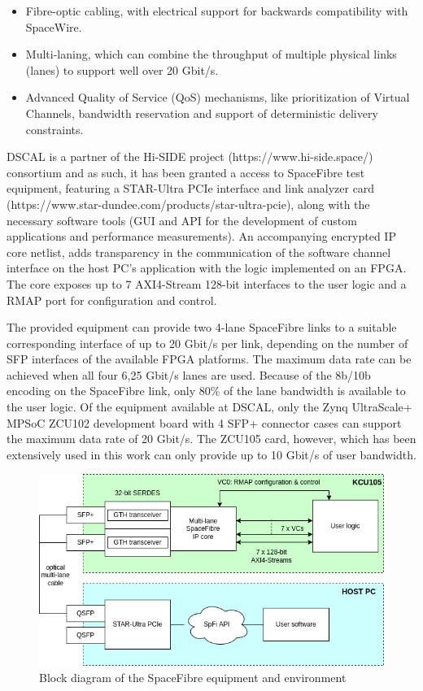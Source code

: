 \begin{itemize}
    \item Fibre-optic cabling, with electrical support for backwards compatibility with SpaceWire.
    \item Multi-laning, which can combine the throughput of multiple physical links (lanes) to support well over 20 Gbit/s.
    \item Advanced Quality of Service (QoS) mechanisms, like prioritization of Virtual Channels, bandwidth reservation and support of deterministic delivery constraints.
\end{itemize}
DSCAL is a partner of the Hi-SIDE project (https://www.hi-side.space/) consortium and as such, it has been granted a access to SpaceFibre test equipment, featuring a STAR-Ultra PCIe interface and link analyzer card (https://www.star-dundee.com/products/star-ultra-pcie), along with the necessary software tools (GUI and API for the development of custom applications and performance measurements). An accompanying encrypted IP core netlist, adds transparency in the communication of the software channel interface on the host PC's application with the logic implemented on an FPGA. The core exposes up to 7 AXI4-Stream 128-bit interfaces to the user logic and a RMAP port for configuration and control.\par
The provided equipment can provide two 4-lane SpaceFibre links to a suitable corresponding interface of up to 20 Gbit/s per link, depending on the number of SFP interfaces of the available FPGA platforms. The maximum data rate can be achieved when all four 6,25 Gbit/s lanes are used. Because of the 8b/10b encoding on the SpaceFibre link, only 80\% of the lane bandwidth is available to the user logic. Of the equipment available at DSCAL, only the Zynq UltraScale+ MPSoC ZCU102 development board with 4 SFP+ connector cases can support the maximum data rate of 20 Gbit/s. The ZCU105 card, however, which has been extensively used in this work can only provide up to 10 Gbit/s of user bandwidth.\par
	\begin{figure}
		\centering
		\includegraphics[width=0.6\linewidth]{Figures/SpFibre.png}
		\caption{Block diagram of the SpaceFibre equipment and environment}
		\label{fig:equipment}
	\end{figure}
